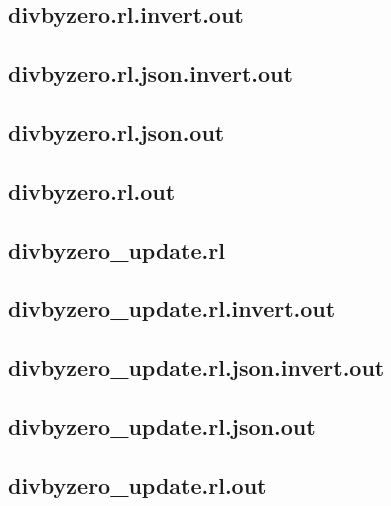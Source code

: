 \subsection{divbyzero.rl.invert.out}
\label{app:divbyzero_rl.invert.out}

\subsection{divbyzero.rl.json.invert.out}
\label{app:divbyzero_rl.json.invert.out}

\subsection{divbyzero.rl.json.out}
\label{app:divbyzero_rl.json.out}

\subsection{divbyzero.rl.out}
\label{app:divbyzero_rl.out}

\subsection{divbyzero\_update.rl}
\label{app:divbyzero_update_rl}

\subsection{divbyzero\_update.rl.invert.out}
\label{app:divbyzero_update_rl.invert.out}

\subsection{divbyzero\_update.rl.json.invert.out}
\label{app:divbyzero_update_rl.json.invert.out}

\subsection{divbyzero\_update.rl.json.out}
\label{app:divbyzero_update_rl.json.out}

\subsection{divbyzero\_update.rl.out}
\label{app:divbyzero_update_rl.out}

